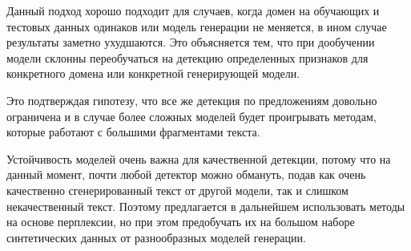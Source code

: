  Данный подход хорошо подходит для случаев, когда домен на обучающих и тестовых данных одинаков или модель генерации не меняется, в ином случае результаты заметно ухудшаются. Это объясняется тем, что при дообучении модели склонны переобучаться на детекцию определенных признаков для конкретного домена или конкретной генерирующей модели.
 
Это подтверждая гипотезу, что все же детекция по предложениям довольно ограничена и в случае более сложных моделей будет проигрывать методам, которые работают с большими фрагментами текста.

 Устойчивость моделей очень важна для качественной детекции, потому что на данный момент, почти любой детектор можно обмануть, подав как очень качественно сгенерированный текст от другой модели, так и слишком некачественный текст. Поэтому предлагается в дальнейшем использовать методы на основе перплексии, но при этом предобучать их на большом наборе синтетических данных от разнообразных моделей генерации.